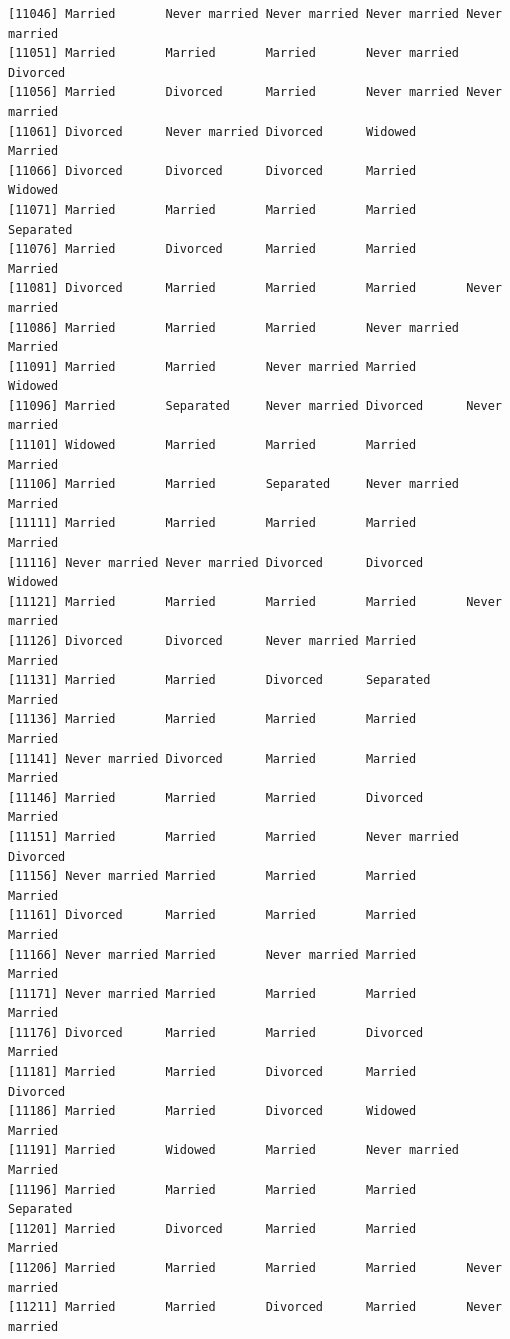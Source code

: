 \documentclass[
  letterpaper,
  DIV=11,
  numbers=noendperiod,
  oneside]{scrartcl}
\begin{document}
\begin{verbatim}
[11046] Married       Never married Never married Never married Never married
[11051] Married       Married       Married       Never married Divorced     
[11056] Married       Divorced      Married       Never married Never married
[11061] Divorced      Never married Divorced      Widowed       Married      
[11066] Divorced      Divorced      Divorced      Married       Widowed      
[11071] Married       Married       Married       Married       Separated    
[11076] Married       Divorced      Married       Married       Married      
[11081] Divorced      Married       Married       Married       Never married
[11086] Married       Married       Married       Never married Married      
[11091] Married       Married       Never married Married       Widowed      
[11096] Married       Separated     Never married Divorced      Never married
[11101] Widowed       Married       Married       Married       Married      
[11106] Married       Married       Separated     Never married Married      
[11111] Married       Married       Married       Married       Married      
[11116] Never married Never married Divorced      Divorced      Widowed      
[11121] Married       Married       Married       Married       Never married
[11126] Divorced      Divorced      Never married Married       Married      
[11131] Married       Married       Divorced      Separated     Married      
[11136] Married       Married       Married       Married       Married      
[11141] Never married Divorced      Married       Married       Married      
[11146] Married       Married       Married       Divorced      Married      
[11151] Married       Married       Married       Never married Divorced     
[11156] Never married Married       Married       Married       Married      
[11161] Divorced      Married       Married       Married       Married      
[11166] Never married Married       Never married Married       Married      
[11171] Never married Married       Married       Married       Married      
[11176] Divorced      Married       Married       Divorced      Married      
[11181] Married       Married       Divorced      Married       Divorced     
[11186] Married       Married       Divorced      Widowed       Married      
[11191] Married       Widowed       Married       Never married Married      
[11196] Married       Married       Married       Married       Separated    
[11201] Married       Divorced      Married       Married       Married      
[11206] Married       Married       Married       Married       Never married
[11211] Married       Married       Divorced      Married       Never married

\end{verbatim}
\end{document}
